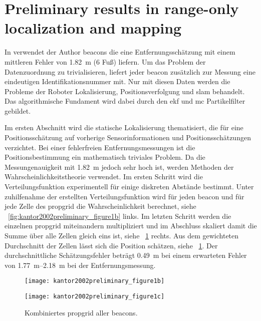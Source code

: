 \section{Preliminary results in range-only localization and mapping}

In \cite{kantor2002preliminary} verwendet der Author \Glspl{beacon} die eine Entfernungsschätzung mit einem mittleren Fehler von \SI{1.82}{\metre} (6 Fuß) liefern. Um das Problem der Datenzuordnung zu trivialisieren, liefert jeder \Gls{beacon} zusätzlich zur Messung eine eindeutigen Identifikationsnummer mit. Nur mit diesen Daten werden die Probleme der Roboter Lokalisierung, Positionsverfolgung und \Gls{slam} behandelt. Das algorithmische Fundament wird dabei durch den \Gls{ekf} und \Gls{mc} Partikelfilter gebildet.

Im ersten Abschnitt wird die statische Lokalisierung thematisiert, die für eine Positionsschätzung auf vorherige Sensorinformationen und Positionsschätzungen verzichtet. Bei einer fehlerfreien Entfernungsmessungen ist die Positionsbestimmung ein mathematisch triviales Problem. Da die Messungenauigkeit mit \SI{1.82}{\metre} jedoch sehr hoch ist, werden Methoden der Wahrscheinlichkeitstheorie verwendet. Im ersten Schritt wird die Verteilungsfunktion experimentell für einige diskreten Abstände bestimmt. Unter zuhilfenahme der erstellten Verteilungsfunktion wird für jeden \Gls{beacon} und für jede Zelle des \Gls{propgrid} die Wahrscheinlichkeit berechnet, siehe \figurename~\ref{fig:kantor2002preliminary_figure1b} links. Im letzten Schritt werden die einzelnen \Gls{propgrid} miteinandern multipliziert und im Abschluss skaliert damit die Summe über alle Zellen gleich eins ist, siehe \figurename~\ref{fig:kantor2002preliminary_figure1c} rechts. Aus dem gewichteten Durchschnitt der Zellen lässt sich die Position schätzen, siehe \figurename~\ref{fig:kantor2002preliminary_figure1c}. Der durchschnittliche Schätzungsfehler beträgt \SI{0.49}{\metre} bei einem erwarteten Fehler von \SIrange{1,77}{2,18}{\metre} bei der Entfernungsmessung.

\begin{figure}[htbp]
  \begin{minipage}[t]{0.45\linewidth}
    \centering
    \texttt{[image: kantor2002preliminary\_figure1b]}
    \caption{Links: \Gls{propgrid} pro \Gls{beacon}. Rechts: Kombination zweier \Glspl{propgrid}.}
    \label{fig:kantor2002preliminary_figure1b}
  \end{minipage}
  \hfill
  \begin{minipage}[t]{0.45\linewidth}
    \centering
    \texttt{[image: kantor2002preliminary\_figure1c]}
    \caption{Kombiniertes \Gls{propgrid} aller \Glspl{beacon}.}
    \label{fig:kantor2002preliminary_figure1c}
  \end{minipage}
\end{figure}

